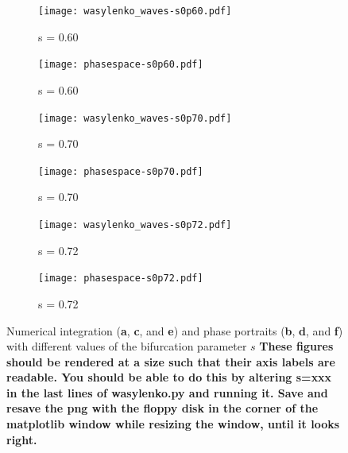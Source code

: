 \documentclass[12pt,letterpaper,oneside,openany]{article}
\begin{document}
\begin{figure}[t]
  \centering
  \begin{subfigure}[b]{0.5\textwidth}
                \centering
                \texttt{[image: wasylenko\_waves-s0p60.pdf]}
                \caption{s = 0.60}
                \label{fig:waves60}
        \end{subfigure}
        \begin{subfigure}[b]{0.4\textwidth}
                \centering
                \texttt{[image: phasespace-s0p60.pdf]}
                \caption{s = 0.60}
                \label{fig:phase60}
        \end{subfigure}

        \begin{subfigure}[b]{0.5\textwidth}
                \centering
                \texttt{[image: wasylenko\_waves-s0p70.pdf]}
                \caption{s = 0.70}
                \label{fig:waves70}
        \end{subfigure}
        \begin{subfigure}[b]{0.4\textwidth}
                \centering
                \texttt{[image: phasespace-s0p70.pdf]}
                \caption{s = 0.70}
                \label{fig:phase70}
        \end{subfigure}

        \begin{subfigure}[b]{0.5\textwidth}
                \centering
                \texttt{[image: wasylenko\_waves-s0p72.pdf]}
                \caption{s = 0.72}
                \label{fig:waves71}
        \end{subfigure}
        \begin{subfigure}[b]{0.4\textwidth}
                \centering
                \texttt{[image: phasespace-s0p72.pdf]}
                \caption{s = 0.72}
                \label{fig:phase72}
        \end{subfigure}

  \caption{Numerical integration ({\bf a}, {\bf c}, and {\bf e}) and phase portraits ({\bf b}, {\bf d}, and {\bf f}) with different values of the bifurcation parameter $s$
\textbf{  These figures should be rendered at a size such that their axis labels are readable. You should be able to do this by altering s=xxx in the last lines of wasylenko.py and running it. Save and resave the png with the floppy disk in the corner of the matplotlib window while resizing the window, until it looks right.}
}
  \label{fig:numint72}
\end{figure}
\end{document}
